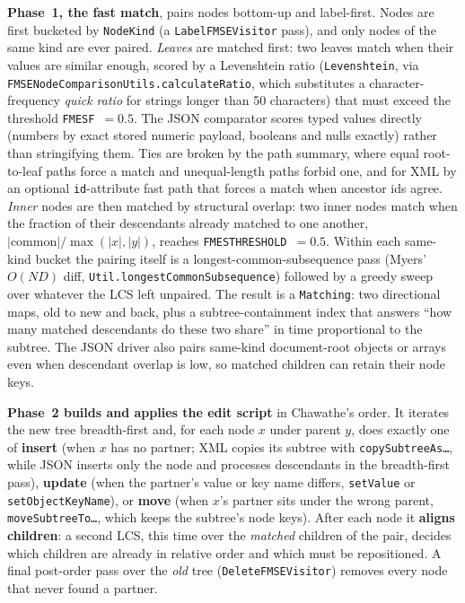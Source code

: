 \documentclass[11pt,a4paper,oneside]{report}
\theoremstyle{sirixthm}
\newcommand{\code}[1]{\texttt{#1}}
\begin{document}
\textbf{Phase~1, the fast match}, pairs nodes bottom-up and label-first. Nodes are first bucketed by
\code{NodeKind} (a \code{LabelFMSEVisitor} pass), and only nodes of the same kind are ever paired.
\emph{Leaves} are matched first: two leaves match when their values are similar enough, scored by a
Levenshtein ratio (\code{Levenshtein}, via \code{FMSENodeComparisonUtils.calculateRatio}, which
substitutes a character-frequency \emph{quick ratio} for strings longer than 50 characters) that must
exceed the threshold \code{FMESF}~$=0.5$. The JSON comparator scores typed values directly (numbers by
exact stored numeric payload, booleans and nulls exactly) rather than stringifying them. Ties are broken by the path
summary, where equal root-to-leaf paths force a match and unequal-length paths forbid one, and for XML
by an optional \code{id}-attribute fast path that forces a match when ancestor ids agree. \emph{Inner}
nodes are then matched by structural overlap: two inner nodes match when the fraction of their
descendants already matched to one another, $\lvert\text{common}\rvert / \max(\lvert x\rvert,\lvert
y\rvert)$, reaches \code{FMESTHRESHOLD}~$=0.5$. Within each same-kind bucket the pairing itself is a
longest-common-subsequence pass (Myers'~\cite{myers} $O(ND)$ diff, \code{Util.longestCommonSubsequence}) followed by
a greedy sweep over whatever the LCS left unpaired. The result is a \code{Matching}: two directional
maps, old to new and back, plus a subtree-containment index that answers ``how many matched descendants
do these two share'' in time proportional to the subtree. The JSON driver also pairs
same-kind document-root objects or arrays even when descendant overlap is low, so matched
children can retain their node keys.

\textbf{Phase~2 builds and applies the edit script} in Chawathe's order. It iterates the new tree
breadth-first and, for each node $x$ under parent $y$, does exactly one of \textbf{insert} (when $x$ has
no partner; XML copies its subtree with \code{copySubtreeAs\ldots}, while JSON inserts
only the node and processes descendants in the breadth-first pass), \textbf{update} (when the partner's
value or key name differs, \code{setValue} or \code{setObjectKeyName}), or \textbf{move} (when $x$'s
partner sits under the wrong parent, \code{moveSubtreeTo\ldots}, which keeps the subtree's node keys).
After each node it \textbf{aligns children}: a second LCS, this time over the \emph{matched} children of
the pair, decides which children are already in relative order and which must be repositioned. A final
post-order pass over the \emph{old} tree (\code{DeleteFMSEVisitor}) removes every node that never found
a partner.
\end{document}
